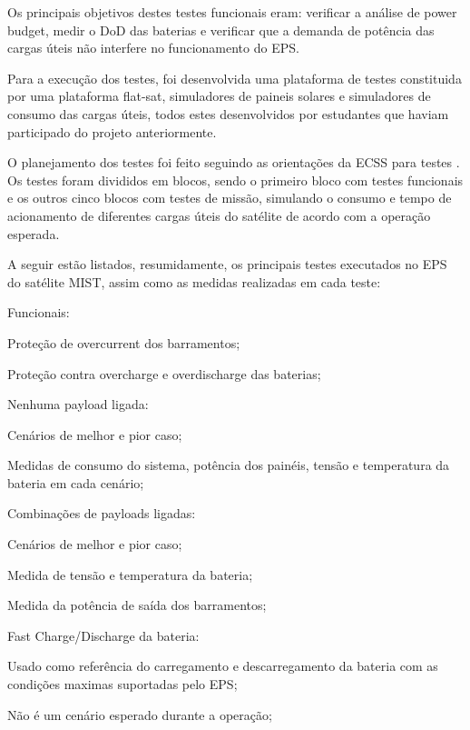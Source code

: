 Os principais objetivos destes testes funcionais eram: verificar a análise de power budget, medir o \gls{DoD} das baterias e verificar que a demanda de potência das cargas úteis não interfere no funcionamento do \gls{EPS}.

Para a execução dos testes, foi desenvolvida uma plataforma de testes constituida por uma plataforma flat-sat, simuladores de paineis solares e simuladores de consumo das cargas úteis, todos estes desenvolvidos por estudantes que haviam participado do projeto anteriormente.

O planejamento dos testes foi feito seguindo as orientações da \gls{ECSS} para testes \cite{ecss-e-st-10-03}.
Os testes foram divididos em blocos, sendo o primeiro bloco com testes funcionais e os outros cinco blocos com testes de missão, simulando o consumo e tempo de acionamento de diferentes cargas úteis do satélite de acordo com a operação esperada.

A seguir estão listados, resumidamente, os principais testes executados no \gls{EPS} do satélite MIST, assim como as medidas realizadas em cada teste:

\begin{alineas}
    \item Funcionais:
    \begin{alineas}
        \item Proteção de overcurrent dos barramentos;
        \item Proteção contra overcharge e overdischarge das baterias;
    \end{alineas}
    \item Nenhuma payload ligada:
    \begin{alineas}
        \item Cenários de melhor e pior caso;
        \item Medidas de consumo do sistema, potência dos painéis, tensão e temperatura da bateria em cada cenário;
    \end{alineas}
    \item Combinações de payloads ligadas:
    \begin{alineas}
        \item Cenários de melhor e pior caso;
        \item Medida de tensão e temperatura da bateria;
        \item Medida da potência de saída dos barramentos;
    \end{alineas}
    \item Fast Charge/Discharge da bateria:
    \begin{alineas}
        \item Usado como referência do carregamento e descarregamento da bateria com as condições maximas suportadas pelo EPS;
        \item Não é um cenário esperado durante a operação;
    \end{alineas}
\end{alineas}



